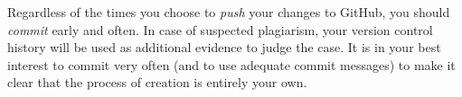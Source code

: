 \documentclass{article}
\begin{document}

Regardless of the times you choose to \emph{push} your changes to
GitHub, you should \emph{commit} early and often. In case of suspected
plagiarism, your version control history will be used as additional
evidence to judge the case. It is in your best interest to commit very
often (and to use adequate commit messages) to make it clear that the
process of creation is entirely your own.







\end{document}
